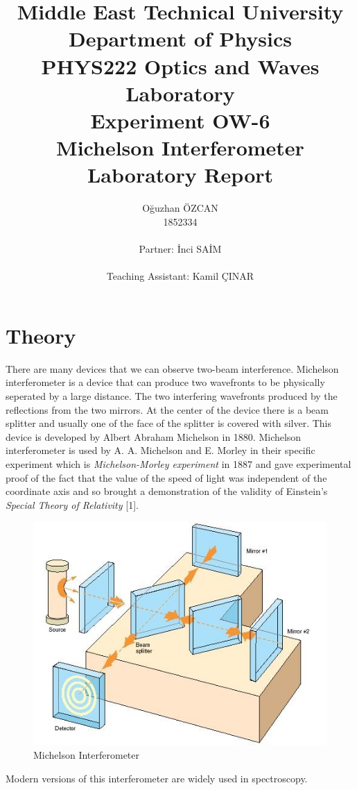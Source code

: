 \documentclass[a4paper,12pt]{report}
\title{Middle East Technical University\\Department of Physics\\PHYS222 Optics and Waves Laboratory\\\textbf{Experiment OW-6\\Michelson Interferometer\\Laboratory Report}}
\author{Oğuzhan ÖZCAN\\1852334\\\\Partner: İnci SAİM\\\\Teaching Assistant: Kamil ÇINAR}
\begin{document}
\maketitle
\tableofcontents
\listoffigures
\listoftables
\chapter{Theory}
There are many devices that we can observe two-beam interference. Michelson interferometer is a device that can produce two wavefronts to be physically seperated by a large distance. The two interfering wavefronts produced by the reflections from the two mirrors. At the center of the device there is a beam splitter and usually one of the face of the splitter is covered with silver. This device is developed by Albert Abraham Michelson in 1880. Michelson interferometer is used by A. A. Michelson and E. Morley in their specific experiment which is \textit{Michelson-Morley experiment} in 1887 and gave
experimental proof of the fact that the value of the speed of light was independent
of the coordinate axis and so brought a demonstration of the validity
of Einstein’s \textit{Special Theory of Relativity} [1].  
\begin{figure}[h!]
\centering
\includegraphics[width=0.75\linewidth, height=0.30\textheight]{michelson}
\caption{Michelson Interferometer}
\label{fig:michelson}
\end{figure}
Modern versions of this interferometer are widely used in spectroscopy.\\\\
\end{document}

